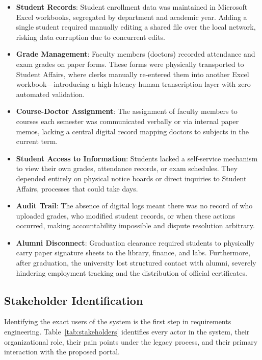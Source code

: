 \begin{itemize}
    \item \textbf{Student Records}: Student enrollment data was maintained in Microsoft Excel workbooks, segregated by department and academic year. Adding a single student required manually editing a shared file over the local network, risking data corruption due to concurrent edits.
    \item \textbf{Grade Management}: Faculty members (doctors) recorded attendance and exam grades on paper forms. These forms were physically transported to Student Affairs, where clerks manually re-entered them into another Excel workbook---introducing a high-latency human transcription layer with zero automated validation.
    \item \textbf{Course-Doctor Assignment}: The assignment of faculty members to courses each semester was communicated verbally or via internal paper memos, lacking a central digital record mapping doctors to subjects in the current term.
    \item \textbf{Student Access to Information}: Students lacked a self-service mechanism to view their own grades, attendance records, or exam schedules. They depended entirely on physical notice boards or direct inquiries to Student Affairs, processes that could take days.
    \item \textbf{Audit Trail}: The absence of digital logs meant there was no record of who uploaded grades, who modified student records, or when these actions occurred, making accountability impossible and dispute resolution arbitrary.
    \item \textbf{Alumni Disconnect}: Graduation clearance required students to physically carry paper signature sheets to the library, finance, and labs. Furthermore, after graduation, the university lost structured contact with alumni, severely hindering employment tracking and the distribution of official certificates.
\end{itemize}

\subsection{Stakeholder Identification}

Identifying the exact users of the system is the first step in requirements engineering. Table~\ref{tab:stakeholders} identifies every actor in the system, their organizational role, their pain points under the legacy process, and their primary interaction with the proposed portal.

